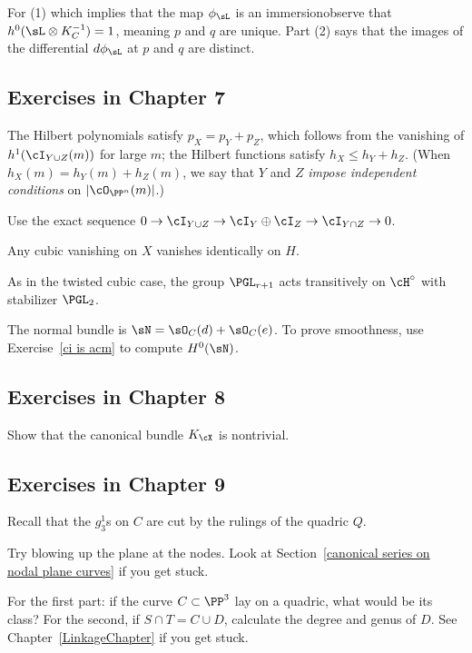 For (1) \emdash which implies that the map $\phi_\sL$ is an
immersion\emdash observe that $h^0(\sL\otimes K_C^{-1}) = 1$, meaning
$p$ and $q$ are unique. Part (2) says that the images of the
differential $d\phi_\sL$ at $p$ and $q$ are distinct.

\subsection*{Exercises in Chapter 7\nopunct}

The Hilbert polynomials satisfy $p_X = p_Y + p_Z$, which follows
from the vanishing of $h^1(\cI_{Y\cup Z} (m))$ for large $m$; the
Hilbert functions satisfy $h_X \leq h_Y + h_Z$. (When $h_X(m) = h_Y(m)
+ h_Z(m)$, we say that $Y$ and $Z$
\emph{impose independent conditions}
%
on $|\cO_{\PP^n}(m)|$.)

Use the exact sequence
$
0 \to \cI_{Y\cup Z} \to \cI_{Y} \oplus \cI_{Z} \to \cI_{Y \cap Z} \to 0
$.

Any cubic vanishing on $X$ vanishes identically on $H$.

As in the twisted cubic case, the group $\PGL_{r+1}$
%
acts transitively on $\cH^\circ$ with stabilizer $\PGL_2$.

The normal bundle is $\sN = \sO_C(d)+\sO_C(e)$. To prove smoothness, use
Exercise~\ref{ci is acm} to compute $H^0(\sN)$.

\subsection*{Exercises in Chapter 8\nopunct}

 Show that the canonical bundle $K_\cX$ is nontrivial.

\subsection*{Exercises in Chapter 9\nopunct}

Recall that the $g^1_3$s on $C$ are cut by the rulings of the quadric $Q$.

Try blowing up
%
the plane at the nodes. Look at
Section~\ref{canonical series on nodal plane curves} if you get stuck.

For the first part: if the curve $C \subset \PP^3$ lay on a quadric,
what would be its class? For the second, if
$S \cap T = C \cup D$, calculate the degree and genus of $D$.
See Chapter~\ref{LinkageChapter} if you get stuck.

